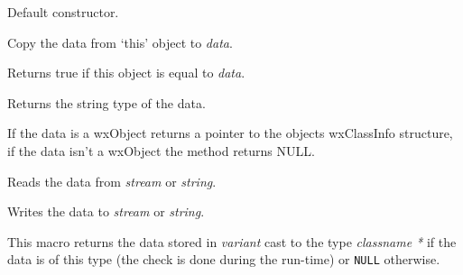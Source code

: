 
\label{wxvariantdatactor}


Default constructor.

\label{wxvariantdatacopy}


Copy the data from `this' object to {\it data}.

\label{wxvariantdataeq}


Returns true if this object is equal to {\it data}.

\label{wxvariantdatagettype}


Returns the string type of the data.

\label{wxvariantdatagetvalueclassinfo}


If the data is a wxObject returns a pointer to the objects wxClassInfo structure, if
the data isn't a wxObject the method returns NULL.

\label{wxvariantdataread}



Reads the data from {\it stream} or {\it string}.

\label{wxvariantdatawrite}



Writes the data to {\it stream} or {\it string}.


\label{wxgetvariantcast}


This macro returns the data stored in {\it variant} cast to the type {\it classname *} if
the data is of this type (the check is done during the run-time) or
{\tt NULL} otherwise. 



\\
\\
